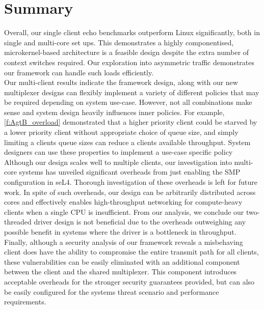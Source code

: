 \section{Summary}

Overall, our single client echo benchmarks outperform Linux significantly, both in single and multi-core set ups.
This demonstrates a highly componentised, microkernel-based architecture is a feasible design despite the extra number
of context switches required. Our exploration into asymmetric traffic demonstrates our framework 
can handle such loads efficiently.\\

Our multi-client results indicate the framework design, along with our new multiplexer 
designs can flexibly implement a variety of different policies that may be required depending on system use-case.
However, not all combinations make sense and system design heavily influences inner policies. 
For example, \autoref{f:AgtB_overload} demonstrated
that a higher priority client could be starved by a lower priority client without appropriate choice
of queue size, and simply limiting a clients queue sizes can reduce a clients available throughput. System designers
can use these properties to implement a use-case specific policy \\

Although our design scales well to multiple clients, our investigation into multi-core systems has 
unveiled significant overheads from just enabling the SMP configuration in seL4.
Thorough investigation of these overheads is left for future work. In spite of such overheads, our design can
be arbitrarily distributed across cores and effectively enables high-throughput networking for compute-heavy clients when a 
single CPU is insufficient. From our analysis, we conclude our two-threaded driver design is not beneficial
due to the overheads outweighing any possible benefit in systems where the driver is a bottleneck in throughput.\\

Finally, although a security analysis of our framework reveals a misbehaving client does have the ability to compromise
the entire transmit path for all clients, these vulnerabilities can be easily eliminated with an additional component between 
the client and the shared multiplexer. This component introduces acceptable overheads for the stronger security
guarantees provided, but can also be easily configured for the systems threat scenario and performance requirements. 
